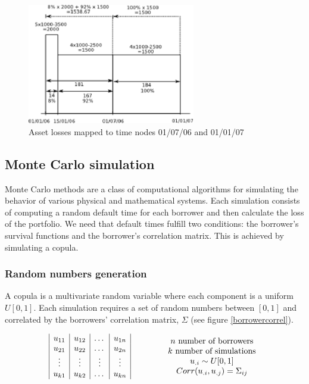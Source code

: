 \documentclass[a4paper,12pt,final]{article}
\begin{document}
\begin{figure}[!hbtp]
\begin{center}
\includegraphics[width=7.34cm, angle=0]{./images/lossesmapping.eps}
\caption{Asset losses mapped to time nodes 01/07/06 and 01/01/07}
\label{lossesmapping}
\end{center}
\end{figure}
\FloatBarrier

\subsection{Monte Carlo simulation}
\label{mcsim}
Monte Carlo methods are a class of computational algorithms for 
simulating the behavior of various physical and mathematical systems. 
Each simulation consists of computing a random default time for each borrower and
then calculate the loss of the portfolio. We need that default times fulfill two 
conditions: the borrower's survival functions and the borrower's correlation matrix. 
This is achieved by simulating a copula. 

\subsubsection{Random numbers generation}
A copula \cite{copu:pitfalls} \cite{copu:wang} is a multivariate random variable 
where each component is a uniform $U[0,1]$. Each simulation requires a set of 
random numbers between $[0, 1]$ and correlated by the borrowers' correlation 
matrix, $\Sigma$ (see figure \ref{borrowercorrel}).

\begin{displaymath}
\begin{array}{ccc}
\begin{array}{|c|c|c|c|}
u_{11} & u_{12} & \dots  & u_{1n} \cr
u_{21} & u_{22} & \dots  & u_{2n} \cr
\vdots & \vdots & \vdots & \vdots \cr
u_{k1} & u_{k2} & \dots  & u_{kn} \cr
\end{array}
&
\qquad
&
\begin{array}{c}
n \textrm{ number of borrowers} \cr
k \textrm{ number of simulations} \cr
u_{.i} \sim U[0,1] \cr
Corr(u_{.i}, u_{.j}) = \Sigma_{ij} \cr
\end{array}
\end{array}
\end{displaymath}
\end{document}
